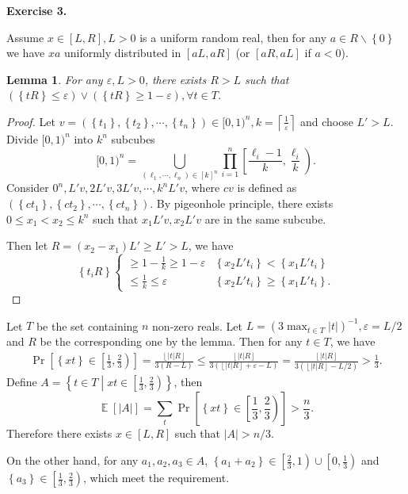 \documentclass[a4paper]{article}
\newtheorem{lemma}{Lemma}
\newtheorem*{proof}{Proof}
\newenvironment{exercise}[1]{
	\par
	\noindent\textbf{Exercise #1.}\quad
}{
	\par
	\bigskip
}
\DeclareMathOperator{\E}{\mathbb E}
\newcommand{\pbra}[1]{\left( #1 \right)}
\newcommand{\cbra}[1]{\left\{ #1 \right\}}
\newcommand{\sbra}[1]{\left[ #1 \right]}
\newcommand{\floorbra}[1]{\left\lfloor #1 \right\rfloor}
\newcommand{\ceilbra}[1]{\left\lceil #1 \right\rceil}
\begin{document}
\begin{exercise}{3}
    Assume $x\in[L,R],L>0$ is a uniform random real, 
    then for any $a\in R\backslash\cbra{0}$ we have $xa$ uniformly distributed in $[aL,aR]$ (or $[aR,aL]$ if $a<0$).
    \begin{lemma}
        For any $\varepsilon,L>0$, there exists $R>L$ such that 
        $\pbra{\cbra{tR}\leq\varepsilon}\lor\pbra{\cbra{tR}\geq1-\varepsilon},\forall t\in T$.
    \end{lemma}
    \begin{proof}
        Let $v=(\cbra{t_1},\cbra{t_2},\cdots,\cbra{t_n})\in[0,1)^n,k=\ceilbra{\frac1\varepsilon}$ and choose $L'>L$.
        Divide $[0,1)^n$ into $k^n$ subcubes 
        $$
        [0,1)^n=\bigcup_{(\ell_1,\cdots,\ell_n)\in[k]^n}\prod_{i=1}^n\left[\frac{\ell_i-1}k,\frac{\ell_i}k\right). 
        $$
        Consider $0^n,L'v,2L'v,3L'v,\cdots,k^nL'v$, where $cv$ is defined as $(\cbra{ct_1},\cbra{ct_2},\cdots,\cbra{ct_n})$.
        By pigeonhole principle, there exists $0\leq x_1<x_2\leq k^n$ such that $x_1L'v,x_2L'v$ are in the same subcube.

        Then let $R=(x_2-x_1)L'\geq L'>L$, we have 
        $$
        \cbra{t_iR}\begin{cases}
            \geq1-\frac1k\geq1-\varepsilon & \cbra{x_2L't_i}<\cbra{x_1L't_i}\\
            \leq\frac1k\leq\varepsilon & \cbra{x_2L't_i}\geq\cbra{x_1L't_i}.
        \end{cases}
        $$
    \end{proof}

    Let $T$ be the set containing $n$ non-zero reals.
    Let $L=\pbra{3\max_{t\in T}|t|}^{-1},\varepsilon=L/2$ and $R$ be the corresponding one by the lemma.
    Then for any $t\in T$, we have
    \begin{align*}
        \Pr\sbra{\cbra{xt}\in\left[\frac13,\frac23\right)}
        =\frac{\floorbra{|t|R}}{3(R-L)}
        \leq\frac{\floorbra{|t|R}}{3(\floorbra{|t|R}+\varepsilon-L)}
        =\frac{\floorbra{|t|R}}{3(\floorbra{|t|R}-L/2)}
        >\frac13.
    \end{align*}
    Define $A=\cbra{t\in T\middle|xt\in\left[\frac13,\frac23\right)}$, then
    $$
    \E\sbra{|A|}=\sum_t\Pr\sbra{\cbra{xt}\in\left[\frac13,\frac23\right)}>\frac n3.
    $$
    Therefore there exists $x\in[L,R]$ such that $|A|>n/3$.

    On the other hand, for any $a_1,a_2,a_3\in A$, $\cbra{a_1+a_2}\in\left[\frac23,1\right)\cup\left[0,\frac13\right)$
    and $\cbra{a_3}\in\left[\frac13,\frac23\right)$, which meet the requirement.
\end{exercise}
\end{document}
